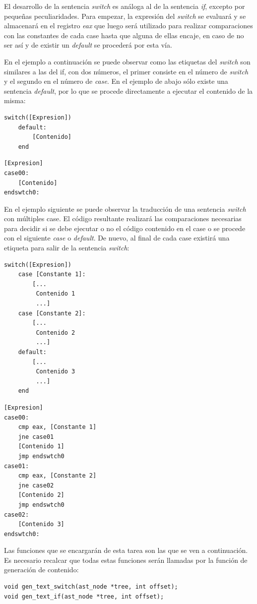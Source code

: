 \documentclass[a4paper,10pt]{article}
\begin{document}
El desarrollo de la sentencia \textit{switch} es análoga al de la sentencia \textit{if}, excepto por pequeñas peculiaridades. Para empezar, la expresión del \textit{switch} se evaluará y se almacenará en el registro \textit{eax} que luego será utilizado para realizar comparaciones con las constantes de cada case hasta que alguna de ellas encaje, en caso de no ser así y de existir un \textit{default} se procederá por esta vía.

En el ejemplo a continuación se puede observar como las etiquetas del \textit{switch} son similares a las del if, con dos números, el primer consiste en el número de \textit{switch} y el segundo en el número de \textit{case}. En el ejemplo de abajo sólo existe una sentencia \textit{default}, por lo que se procede directamente a ejecutar el contenido de la misma:
\begin{multicols}{2}
\begin{lstlisting}[language=jam,frame=single]
	switch([Expresion])
	default:
		[Contenido]
	end
\end{lstlisting}
\begin{lstlisting}[frame=single]
	[Expresion]
case00:
	[Contenido]
endswtch0:
\end{lstlisting}
\end{multicols}

En el ejemplo siguiente se puede observar la traducción de una sentencia \textit{switch} con múltiples case. El código resultante realizará las comparaciones necesarias para decidir si se debe ejecutar o no el código contenido en el case o se procede con el siguiente \textit{case} o \textit{default}. De nuevo, al final de cada case existirá una etiqueta para salir de la sentencia \textit{switch}:

\begin{multicols}{2}
\begin{lstlisting}[language=jam,frame=single]
	switch([Expresion])
	case [Constante 1]:
		[...
		 Contenido 1
		 ...]
	case [Constante 2]:
		[...
		 Contenido 2
		 ...]
	default:
		[...
		 Contenido 3
		 ...]
	end
\end{lstlisting}
\begin{lstlisting}[frame=single]
	[Expresion]
case00:
	cmp eax, [Constante 1]
	jne case01
	[Contenido 1]
	jmp endswtch0
case01:
	cmp eax, [Constante 2]
	jne case02
	[Contenido 2]
	jmp endswtch0
case02:
	[Contenido 3]
endswtch0:
\end{lstlisting}
\end{multicols}

Las funciones que se encargarán de esta tarea son las que se ven a continuación. Es necesario recalcar que todas estas funciones serán llamadas por la función de generación de contenido:
\begin{lstlisting}
void gen_text_switch(ast_node *tree, int offset);
void gen_text_if(ast_node *tree, int offset);
\end{lstlisting}
\end{document}
